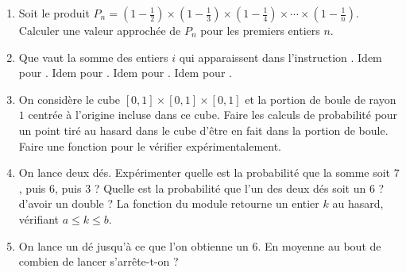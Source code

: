 \begin{frame}

\small
\begin{miniexercice}
\begin{enumerate}
  \item Soit le produit $P_n = (1-\frac12)\times (1-\frac13) \times (1-\frac14)\times \cdots \times(1-\frac1n)$.
  Calculer une valeur approchée de $P_n$ pour les premiers entiers $n$.
  
  \item Que vaut la somme des entiers $i$ qui apparaissent dans l'instruction .
  Idem pour . Idem pour . Idem pour .
  Idem pour .
  
  \item On considère le cube $[0,1] \times [0,1] \times [0,1]$ et la portion de boule de rayon $1$ centrée à l'origine incluse dans ce cube.
  Faire les calculs de probabilité pour un point tiré au hasard dans le cube d'être en fait dans la portion de boule.
  Faire une fonction pour le vérifier expérimentalement.
  
  \item On lance deux dés. Expérimenter quelle est la probabilité que la somme soit $7$, puis $6$, puis $3$ ?
  Quelle est la probabilité que l'un des deux dés soit un $6$ ? d'avoir un double ?
  La fonction  du module  retourne un entier $k$ 
  au hasard, vérifiant $a \le k \le b$.
  
  \item On lance un dé jusqu'à ce que l'on obtienne un $6$. En moyenne au bout de combien de lancer s'arrête-t-on ? 
\end{enumerate}
\end{miniexercice}

\end{frame}

